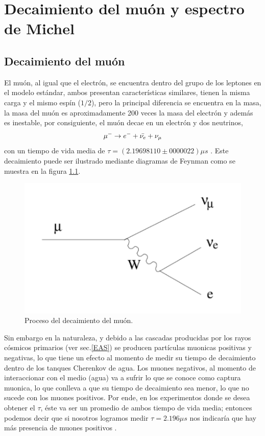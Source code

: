 \chapter{Decaimiento del muón y espectro de Michel}\label{DEC_MUON_MICHEL}
\section{Decaimiento del muón}
	El muón, al igual que el electrón, se encuentra dentro del grupo de los leptones en el modelo estándar, ambos presentan características similares, tienen la misma carga y el mismo espín ($1/2$), pero la principal diferencia se encuentra en la masa, la masa del muón es aproximadamente 200 veces la masa del electrón y además es inestable, por consiguiente, el muón decae en un electrón y dos neutrinos,\\
	\begin{equation}
	\mu^{-} \rightarrow e^{-}+\Bar{\nu_{e}}+\nu_{\mu}
	\end{equation}
	con un tiempo de vida media de $\tau=(2.19698110\pm 0000022)\mu s$ \cite{Olive_2014}. Este decaimiento puede ser ilustrado mediante diagramas de Feynman como se muestra en la figura \ref{MUON_DECAY}.
	
	\begin{figure}[h]
		\centering
		\includegraphics[scale = 0.65]{FIGURAS/MUON_DECAY.png}
		\caption{Proceso del decaimiento del muón.}
		\label{MUON_DECAY}
	\end{figure}

	Sin embargo en la naturaleza, y debido a las cascadas producidas por los rayos cósmicos primarios (ver sec.\ref{EAS}) se producen partículas muonicas positivas y negativas, lo que tiene un efecto al momento de medir su tiempo de decaimiento dentro de los tanques Cherenkov de agua. Los muones negativos, al momento de interaccionar con el medio (agua) va a sufrir lo que se conoce como captura muonica, lo que conlleva a que su tiempo de decaimiento sea menor, lo que no sucede con los muones positivos. Por ende, en los experimentos donde se desea obtener el $\tau$, éste va ser un promedio de ambos tiempo de vida media; entonces podemos decir que si nosotros logramos medir $\tau=2.196 \mu s$ nos indicaría que hay más presencia de muones positivos \cite{Holmlid}.
	
